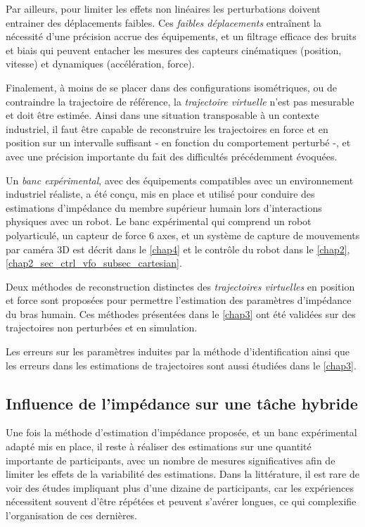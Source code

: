 Par ailleurs, pour limiter les effets non linéaires les perturbations doivent entrainer des déplacements faibles. Ces \emph{faibles déplacements} entraînent la nécessité d'une précision accrue des équipements, et un filtrage efficace des bruits et biais qui peuvent entacher les mesures des capteurs cinématiques (position, vitesse) et dynamiques (accélération, force).

Finalement, à moins de se placer dans des configurations isométriques, ou de contraindre la trajectoire de référence, la \emph{trajectoire virtuelle} n'est pas mesurable et doit être estimée. Ainsi dans une situation transposable à un contexte industriel, il faut être capable de reconstruire les trajectoires en force et en position sur un intervalle suffisant - en fonction du comportement perturbé -, et avec une précision importante du fait des difficultés précédemment évoquées.

\begin{description}[font=$\bullet$,labelindent=.5cm]
	\item Un \emph{banc expérimental}, avec des équipements compatibles avec un environnement industriel réaliste, a été conçu, mis en place et utilisé pour conduire des estimations d'impédance du membre supérieur humain lors d'interactions physiques avec un robot. Le banc expérimental qui comprend un robot polyarticulé, un capteur de force 6 axes, et un système de capture de mouvements par caméra 3D est décrit dans le \cref{chap4} et le contrôle du robot dans le \cref{chap2}, \cref{chap2_sec_ctrl_vfo_subsec_cartesian}.
	\item Deux méthodes de reconstruction distinctes des \emph{trajectoires virtuelles} en position et force sont proposées pour permettre l'estimation des paramètres d'impédance du bras humain. Ces méthodes présentées dans le \cref{chap3} ont été validées sur des trajectoires non perturbées et en simulation.
	\item Les erreurs sur les paramètres induites par la méthode d'identification ainsi que les erreurs dans les estimations de trajectoires sont aussi étudiées dans le \cref{chap3}.
\end{description}

\subsection{Influence de l'impédance sur une tâche hybride}

Une fois la méthode d'estimation d'impédance proposée, et un banc expérimental adapté mis en place, il reste à réaliser des estimations sur une quantité importante de participants, avec un nombre de mesures significatives afin de limiter les effets de la variabilité des estimations. Dans la littérature, il est rare de voir des études impliquant plus d'une dizaine de participants, car les expériences nécessitent souvent d'être répétées et peuvent s'avérer longues, ce qui complexifie l'organisation de ces dernières.

